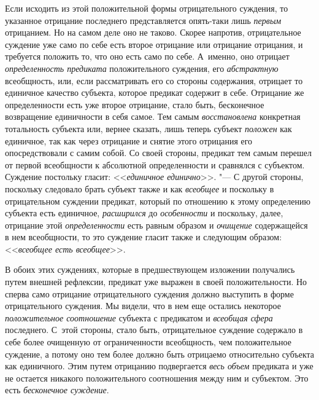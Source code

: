{Если исходить из этой положительной формы отрицательного
суждения, то указанное отрицание последнего представляется опять-таки лишь
{\em первым} отрицанием.
Но на самом деле оно не таково. Скорее напротив, отрицательное суждение уже
само по себе есть второе отрицание или отрицание отрицания, и требуется
положить то, что оно есть само по себе. А~именно, оно отрицает
{\em определенность предиката}
положительного суждения, его
{\em абстрактную}
всеобщность, или, если рассматривать его со стороны
содержания, отрицает то единичное качество субъекта, которое предикат
содержит в себе. Отрицание же определенности есть уже второе отрицание,
стало быть, бесконечное возвращение единичности в себя самое. Тем самым
{\em восстановлена}
конкретная тотальность субъекта или, вернее сказать, лишь
теперь субъект {\em положен}
как единичное, так как через отрицание и снятие этого
отрицания его опосредствовали с самим собой. Со своей стороны, предикат тем
самым перешел от первой всеобщности к абсолютной определенности и сравнялся
с субъектом. Суждение постольку гласит:
<<{\em единичное единично}>>. "---
С другой стороны, поскольку следовало брать субъект также и
как {\em всеобщее} и
поскольку в отрицательном суждении предикат, который по отношению к этому
определению субъекта есть единичное,
{\em расширился} до
{\em особенности} и
поскольку, далее, отрицание этой
{\em определенности} есть
равным образом и {\em очищение}
содержащейся в нем всеобщности, то это суждение гласит также
и следующим образом: <<{\em всеобщее есть всеобщее}>>.

В обоих этих суждениях, которые в предшествующем
изложении
получались путем внешней рефлексии, предикат уже выражен в
своей положительности. Но сперва само отрицание отрицательного суждения
должно выступить в форме отрицательного суждения. Мы видели, что в нем еще
остались некоторое {\em положительное
соотношение} субъекта с предикатом и
{\em всеобщая сфера}
последнего. С~этой стороны, стало быть,
отрицательное суждение содержало в себе более очищенную от ограниченности
всеобщность, чем положительное суждение, а потому оно тем более должно быть
отрицаемо относительно субъекта как единичного. Этим путем отрицанию
подвергается {\em весь объем}
предиката и уже не остается никакого положительного
соотношения между ним и субъектом. Это есть
{\em бесконечное суждение}.

}
